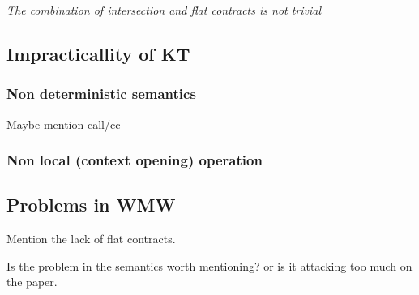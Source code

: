 \textit{The combination of intersection and flat contracts is not trivial}


\subsection{Impracticallity of KT}

\subsubsection{Non deterministic semantics}

Maybe mention call/cc

\subsubsection{Non local (context opening) operation}

\subsection{Problems in WMW}

Mention the lack of flat contracts.

Is the problem in the semantics worth mentioning? or is it attacking too much on the paper.


